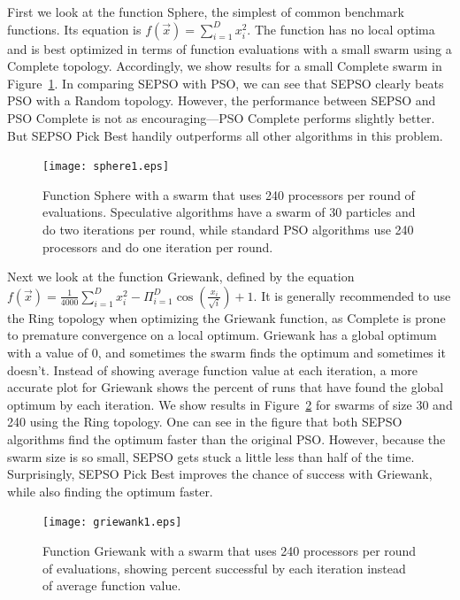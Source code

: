 \documentclass[oneside,honors]{honors}
\newcommand{\fig}[1]{Figure~\ref{fig:#1}}
\begin{document}
First we look at the function Sphere, the simplest of common benchmark
functions.  Its equation is $f(\Vec{x}) = \sum_{i=1}^D x_i^2$.  The function
has no local optima and is best optimized in terms of function evaluations with
a small swarm using a Complete topology.  Accordingly, we show results for a
small Complete swarm in \fig{sphere1}.  In comparing SEPSO with PSO, we can see
that SEPSO clearly beats PSO with a Random topology.  However, the performance
between SEPSO and PSO Complete is not as encouraging---PSO Complete performs
slightly better.  But SEPSO Pick Best handily outperforms all other algorithms
in this problem.

\begin{figure}
  \centering
  \texttt{[image: sphere1.eps]}
  \caption{Function Sphere with a swarm that uses 240 processors per round of
  evaluations.  Speculative algorithms have a swarm of 30 particles and do two
  iterations per round, while standard PSO algorithms use 240 processors and do
  one iteration per round.}
  \label{fig:sphere1}
\end{figure}

Next we look at the function Griewank, defined by the equation $f(\Vec{x}) =
\frac{1}{4000} \sum_{i=1}^D x_i^2 - \Pi_{i=1}^D \cos\left(\frac{x_i}{\sqrt{i}}
\right) + 1$.  It is generally recommended to use the Ring topology when
optimizing the Griewank function, as Complete is prone to premature convergence
on a local optimum.  Griewank has a global optimum with a value of 0, and
sometimes the swarm finds the optimum and sometimes it doesn't.  Instead of
showing average function value at each iteration, a more accurate plot for
Griewank shows the percent of runs that have found the global optimum by each
iteration.  We show results in \fig{griewank1} for swarms of size 30 and 240
using the Ring topology.  One can see in the figure that both SEPSO algorithms
find the optimum faster than the original PSO.  However, because the swarm size
is so small, SEPSO gets stuck a little less than half of the time.
Surprisingly, SEPSO Pick Best improves the chance of success with Griewank,
while also finding the optimum faster.

\begin{figure}
  \centering
  \texttt{[image: griewank1.eps]}
  \caption{Function Griewank with a swarm that uses 240 processors per round of
  evaluations, showing percent successful by each iteration instead of average
  function value.}
  \label{fig:griewank1}
\end{figure}
\end{document}
